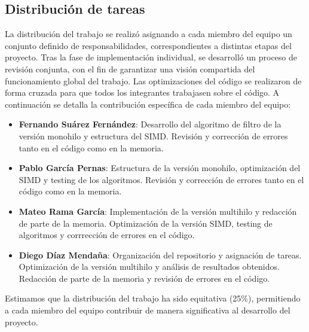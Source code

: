 \documentclass[11pt,a4paper]{article}
\begin{document}
\subsection{Distribución de tareas}
La distribución del trabajo se realizó asignando a cada miembro del equipo un conjunto definido de responsabilidades, correspondientes a distintas etapas del proyecto. Tras la fase de implementación individual, se desarrolló un proceso de revisión conjunta, con el fin de garantizar una visión compartida del funcionamiento global del trabajo. Las optimizaciones del código 
se realizaron de forma cruzada para que todos los integrantes trabajasen 
sobre el código. A continuación se detalla la contribución específica de cada miembro del equipo:
\begin{itemize}
    \item \textbf{Fernando Suárez Fernández}: Desarrollo del algoritmo de filtro de la versión monohilo y estructura del SIMD. Revisión y corrección de errores tanto en el código como en la memoria.
    \item \textbf{Pablo García Pernas}: Estructura de la versión monohilo, optimización del SIMD y testing de los algoritmos. Revisión y corrección de errores tanto en el código como en la memoria.
    \item \textbf{Mateo Rama García}: Implementación de la versión multihilo y redacción de parte de la memoria. Optimización de la versión SIMD, testing de algoritmos y corrrección de errores en el código.
    \item \textbf{Diego Díaz Mendaña}: Organización del repositorio y asignación de tareas. Optimización de la versión multihilo y análisis de resultados obtenidos. Redacción de parte de la memoria y revisión de errores 
    en el código.
   
\end{itemize}
\vspace{1ex}

Estimamos que la distribución del trabajo ha sido equitativa (25\%), permitiendo a cada miembro del equipo contribuir de manera significativa al desarrollo del proyecto.
\end{document}
